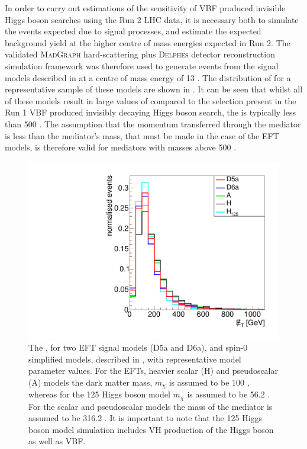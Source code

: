 
In order to carry out estimations of the sensitivity of \ac{VBF} produced invisible Higgs boson searches using the Run 2 LHC data, it is necessary both to simulate the events expected due to signal processes, and estimate the expected background yield at the higher centre of mass energies expected in Run 2. The validated \textsc{MadGraph} hard-scattering plus \textsc{Delphes} detector reconstruction simulation framework was therefore used to generate events from the signal models described in  at a centre of mass energy of 13 \TeV. The distribution of \MET for a representative sample of these models are shown in . It can be seen that whilst all of these models result in large values of \MET compared to the selection present in the Run 1 \ac{VBF} produced invisibly decaying Higgs boson search, the \MET is typically less than 500 \GeV. The assumption that the momentum transferred through the mediator is less than the mediator's mass, that must be made in the case of the \ac{EFT} models, is therefore valid for mediators with masses above 500 \GeV.

\begin{figure}
  \includegraphics[width=\largefigwidth]{plots/interp/modelmet.pdf}
  \caption{The \MET, for two \ac{EFT} signal models (D5a and D6a), and spin-0 simplified models, described in , with representative model parameter values. For the \ac{EFT}s, heavier scalar (H) and pseudoscalar (A) models the dark matter mass, $m_{\chi}$ is assumed to be 100 \GeV, whereas for the 125 \GeV Higgs boson model $m_{\chi}$ is assumed to be 56.2 \GeV. For the scalar and pseudoscalar models the mass of the mediator is assumed to be 316.2 \GeV. It is important to note that the 125 \GeV Higgs boson model simulation includes \ac{VH} production of the Higgs boson as well as \ac{VBF}.}
  \label{fig:dmmodelkinematics}
\end{figure}

